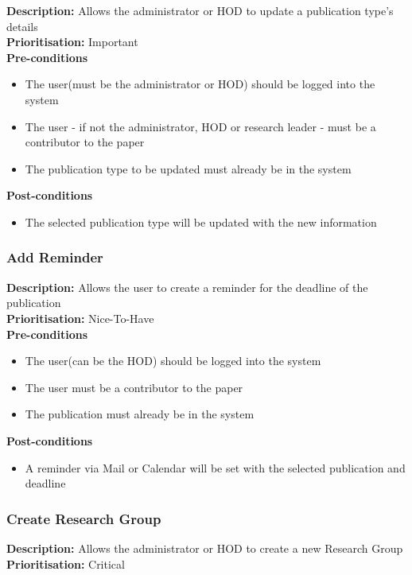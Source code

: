 \documentclass[a4paper]{article}
\begin{document}
    \textbf{Description:} Allows the administrator or HOD to update a publication type's details\\
    \textbf{Prioritisation:} Important\\
    
    
    \textbf{Pre-conditions}
     \begin{itemize}
        \item The user(must be the administrator or HOD) should be logged into the system
        \item The user - if not the administrator, HOD or research leader - must be a contributor to the paper
        \item The publication type to be updated must already be in the system
   \end{itemize}
    
    \textbf{Post-conditions}
    \begin{itemize}
        \item The selected publication type will be updated with the new information
    \end{itemize}
    
    \subsubsection{Add Reminder}
        \textbf{Description:} Allows the user to create a reminder for the deadline of the publication\\
        \textbf{Prioritisation:} Nice-To-Have
        \\
        
        \textbf{Pre-conditions}
        \begin{itemize}
        	\item The user(can be the HOD) should be logged into the system
        	\item The user must be a contributor to the paper
        	\item The publication must already be in the system
        \end{itemize}
        
        \textbf{Post-conditions}
        \begin{itemize}
        	\item A reminder via Mail or Calendar will be set with the selected publication and deadline
        \end{itemize}
    
	\subsubsection{Create Research Group}
	\textbf{Description:} Allows the administrator or HOD to create a new Research Group\\
	\textbf{Prioritisation:} Critical\\
	
\end{document}
